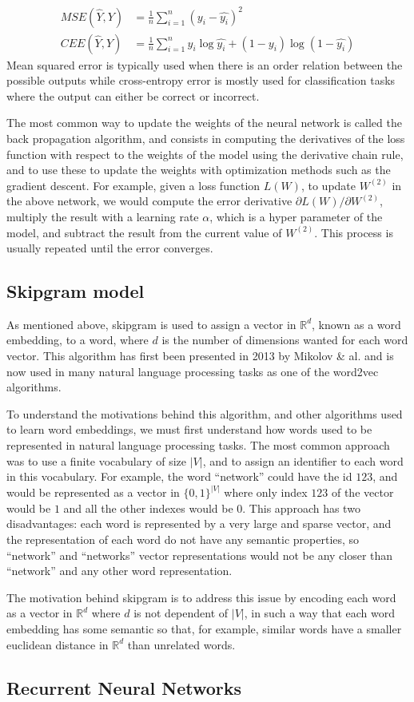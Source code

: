 \begin{align}
  \label{eq:mse}MSE(\hat{Y}, Y) &= \frac{1}{n}\sum_{i=1}^{n} \left( y_i - \hat{y_i} \right)^2\\
  \label{eq:cee}CEE(\hat{Y}, Y) &= \frac{1}{n}\sum_{i=1}^{n}
                                  y_i\log\hat{y_i} + (1 - y_i)\log(1 - \hat{y_i})
\end{align}
Mean squared error is typically used when there is an order relation between the
possible outputs while cross-entropy error is mostly used for classification
tasks where the output can either be correct or incorrect.

The most common way to update the weights of the neural network is called the
back propagation algorithm, and consists in computing the derivatives of the
loss function with respect to the weights of the model using the derivative
chain rule, and to use these to update the weights with optimization methods
such as the gradient descent. For example, given a loss function $L(W)$, to
update $W^{(2)}$ in the above network, we would compute the error derivative
$\partial L(W)/\partial W^{(2)}$, multiply the result with a learning
rate $\alpha$, which is a hyper parameter of the model, and subtract the result
from the current value of $W^{(2)}$. This process is usually repeated until the
error converges.
\subsection{Skipgram model}
As mentioned above, skipgram is used to assign a vector in $\mathbb{R}^d$, known
as a word embedding, to a word, where $d$ is the number of dimensions wanted for
each word vector. This algorithm has first been presented in 2013 by Mikolov \&
al. \cite{DBLP:journals/corr/MikolovSCCD13} and is now used in many natural
language processing tasks as one of the word2vec algorithms.

To understand the motivations behind this algorithm, and other algorithms used
to learn word embeddings, we must first understand how words used to be
represented in natural language processing tasks. The most common approach was
to use a finite vocabulary of size $|V|$, and to assign an identifier to each
word in this vocabulary. For example, the word ``network'' could have the id
$123$, and would be represented as a vector in $\{0,1\}^{|V|}$ where only index
$123$ of the vector would be $1$ and all the other indexes would be $0$. This
approach has two disadvantages: each word is represented by a very large and
sparse vector, and the representation of each word do not have any semantic
properties, so ``network'' and ``networks'' vector representations would not be
any closer than ``network'' and any other word representation.

The motivation behind skipgram is to address this issue by encoding each word
as a vector in $\mathbb{R}^d$ where $d$ is not dependent of $|V|$, in such a way
that each word embedding has some semantic so that, for example, similar words
have a smaller euclidean distance in $\mathbb{R}^d$ than unrelated words.
\subsection{Recurrent Neural Networks}
